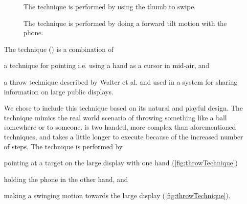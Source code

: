 \begin{figure}[H]
\caption{
	\protect{} The \swipe technique is performed by using the thumb to swipe.
}
\label{fig:swipeTechnique}
\end{figure}

\begin{figure}[H]
\caption{
	\protect{} The \tilt technique is performed by doing a forward tilt motion with the phone.
}
\label{fig:tiltTechnique}
\end{figure}

The \throw technique () is a combination of  
\begin{enumerate*}[label=\itshape\alph*\upshape)]
	\item{a technique for pointing \cite{Scheible:2008} i.e. using a hand as a cursor in mid-air, and}
	\item{a throw technique described by Walter et al. \cite{Walter:2014} and used in a system for sharing information on large public displays.}
\end{enumerate*}
We chose to include this technique based on its natural and playful design.
The technique mimics the real world scenario of throwing something like a ball somewhere or to someone.
\throw is two handed, more complex than aforementioned techniques, and takes a little longer to execute because of the increased number of steps.
The \throw technique is performed by 
\begin{enumerate*}[label=\itshape\roman*\upshape)]
	\item{pointing at a target on the large display with one hand (\cref{fig:throwTechnique})} 
	\item{holding the phone in the other hand, and}
	\item{making a swinging motion towards the large display (\cref{fig:throwTechnique}).}
\end{enumerate*}

